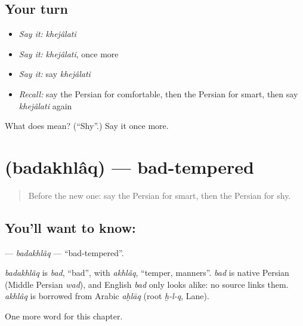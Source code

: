 \subsection*{Your turn}
\begin{itemize}
\raggedright
  \item \emph{Say it:} \emph{khejâlati}
  \item \emph{Say it:} \emph{khejâlati}, once more
  \item \emph{Say it:} say \emph{khejâlati}
  \item \emph{Recall:} say the Persian for comfortable, then the Persian for smart, then say \emph{khejâlati} again
\end{itemize}

\begin{tcolorbox}[breakable,colback=teal!4,colframe=teal!35!black,title={Before you move on}]
What does  mean? (\textquotedblleft{}Shy\textquotedblright{}.) Say it once more.
\end{tcolorbox}
\section[\texorpdfstring{\fa{بداخلاق} (badakhlâq)}{بداخلاق (badakhlâq)}]{ (badakhlâq) — bad-tempered}

\label{lesson:FA-C200-badakhlaq}



\begin{quote}
Before the new one: say the Persian for smart, then the Persian for shy.
\end{quote}

\subsection*{You'll want to know: }
\textbf{} — \emph{badakhlâq} — \textquotedblleft{}bad-tempered\textquotedblright{}.

\begin{cousinweb}
\emph{badakhlâq} is \emph{bad}, \textquotedblleft{}bad\textquotedblright{}, with \emph{akhlâq}, \textquotedblleft{}temper, manners\textquotedblright{}. \emph{bad} is native Persian (Middle Persian \emph{wad}), and English \emph{bad} only looks alike: no source links them. \emph{akhlâq} is borrowed from Arabic \emph{aḫlāq} (root \emph{ḫ-l-q}, Lane).
\end{cousinweb}

\begin{grammarlens}[title={What you've built}]
One more word for this chapter.
\end{grammarlens}

